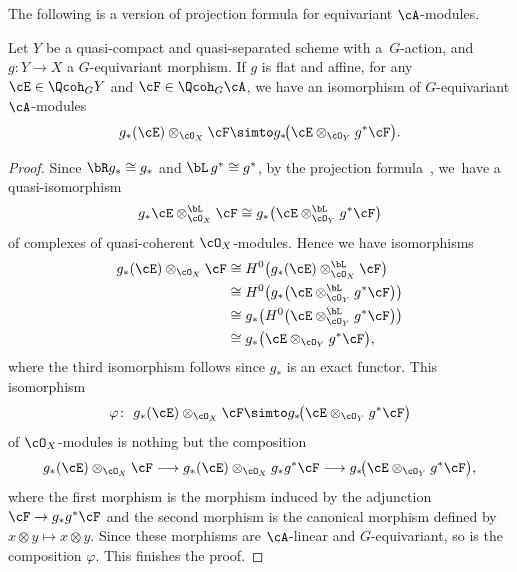 The following is a version of projection formula for equivariant $\cA$-modules.

\begin{lem}\label{proj form}
Let $Y$ be a quasi-compact and quasi-separated scheme with a~$G$-action, and $g\colon Y\to X$ a $G$-equivariant morphism. If $g$ is flat and affine, for any $\cE\in \Qcoh_G Y$ and $\cF\in \Qcoh_G\cA$, we have an isomorphism of $G$-equivariant $\cA$-modules
\begin{gather*}
g_*(\cE)\otimes_{\cO_X} \cF\simto g_*\!\big(\cE\otimes_{\cO_Y}g^*\cF \big).
\end{gather*}
\begin{proof}
Since $\bR g_*\cong g_*$ and $\bL \,g^*\cong g^*$, by the projection formula~\cite[Proposition~3.9.4]{lip}, we~have a quasi-isomorphism
\begin{gather*}
g_*\cE\otimes^{\bL}_{\cO_X}\cF\cong g_*\big(\cE\otimes^{\bL}_{\cO_Y}g^*\cF\big)
\end{gather*}
of complexes of quasi-coherent $\cO_X$-modules. Hence we have isomorphisms
\begin{align*}
g_*(\cE)\otimes_{\cO_X} \cF&\cong H^0\big(g_*(\cE)\otimes^{\bL}_{\cO_X}\cF\big)\\
&\cong H^0\big(g_*\big(\cE\otimes^{\bL}_{\cO_Y}g^*\cF\big)\big)\\
&\cong g_*\big(H^0\big(\cE\otimes^{\bL}_{\cO_Y}g^*\cF\big)\big)\\
&\cong g_*\big(\cE\otimes_{\cO_Y}g^*\cF\big),
\end{align*}
where the third isomorphism follows since $g_*$ is an exact functor. This isomorphism
\begin{gather*}
\varphi\colon\ g_*(\cE)\otimes_{\cO_X} \cF\simto g_*\!\big(\cE\otimes_{\cO_Y}g^*\cF \big)
\end{gather*}
of $\cO_X$-modules is nothing but the composition
\begin{gather*}
 g_*(\cE)\otimes_{\cO_X} \cF\longrightarrow g_*(\cE)\otimes_{\cO_X} g_*g^*\cF\longrightarrow g_*\!\big(\cE\otimes_{\cO_Y}g^*\cF \big),
\end{gather*}
where the first morphism is the morphism induced by the adjunction $\cF\to g_*g^*\cF$ and the second morphism is the canonical morphism defined by $x\otimes y\mapsto x\otimes y$. Since these morphisms are $\cA$-linear and $G$-equivariant, so is the composition $\varphi$. This finishes the proof.
\end{proof}
\end{lem}

